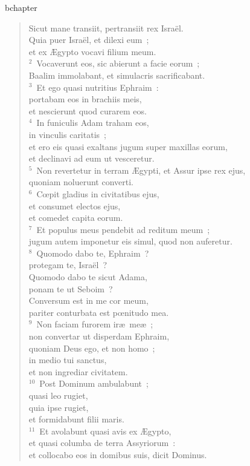 bchapter\begin{verse}\vspace{-19pt}Sicut mane transiit, pertransiit rex Isra\"el.\\ Quia puer Isra\"el, et dilexi eum~;\\ et ex \AE gypto vocavi filium meum.\\
${}^{2}$~Vocaverunt eos, sic abierunt a facie eorum~;\\ Baalim immolabant, et simulacris sacrificabant.\\
${}^{3}$~Et ego quasi nutritius Ephraim~:\\ portabam eos in brachiis meis,\\ et nescierunt quod curarem eos.\\
${}^{4}$~In funiculis Adam traham eos,\\ in vinculis caritatis~;\\ et ero eis quasi exaltans jugum super maxillas eorum,\\ et declinavi ad eum ut vesceretur.\\
${}^{5}$~Non revertetur in terram \AE gypti, et Assur ipse rex ejus,\\ quoniam noluerunt converti.\\
${}^{6}$~Cœpit gladius in civitatibus ejus,\\ et consumet electos ejus,\\ et comedet capita eorum.\\
${}^{7}$~Et populus meus pendebit ad reditum meum~;\\ jugum autem imponetur eis simul, quod non auferetur.\\
${}^{8}$~Quomodo dabo te, Ephraim~?\\ protegam te, Isra\"el~?\\ Quomodo dabo te sicut Adama,\\ ponam te ut Seboim~?\\ Conversum est in me cor meum,\\ pariter conturbata est pœnitudo mea.\\
${}^{9}$~Non faciam furorem ir\ae\ me\ae~;\\ non convertar ut disperdam Ephraim,\\ quoniam Deus ego, et non homo~;\\ in medio tui sanctus,\\ et non ingrediar civitatem.\\
${}^{10}$~Post Dominum ambulabunt~;\\ quasi leo rugiet,\\ quia ipse rugiet,\\ et formidabunt filii maris.\\
${}^{11}$~Et avolabunt quasi avis ex \AE gypto,\\ et quasi columba de terra Assyriorum~:\\ et collocabo eos in domibus suis, dicit Dominus.\end{verse}



